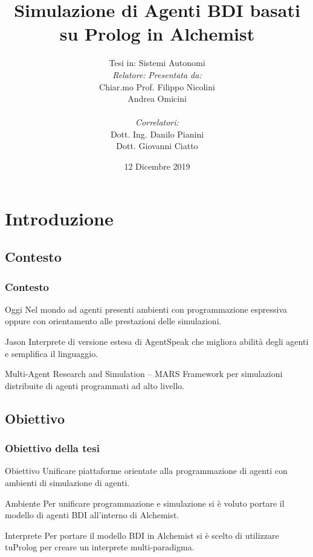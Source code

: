 \documentclass[handout]{beamer}\mode<presentation>{\usetheme{AMSCesenaBleu}}
\title[Prolog BDI agents on Alchemist]{Simulazione di Agenti BDI basati su Prolog in Alchemist}
\author[Filippo Nicolini]{Tesi in: Sistemi Autonomi\\
[0.5cm]
\textit{Relatore:} \hspace{6.55cm} \textit{Presentata da:}\\
Chiar.mo Prof. \hspace{5.5cm} Filippo Nicolini\\
Andrea Omicini \hspace{7.6cm} \phantom{g}\\
\textit{\\Correlatori:} \hspace{8.25cm} \phantom{g}\\
Dott. Ing. Danilo Pianini \hspace{6cm} \phantom{g}\\
Dott. Giovanni Ciatto \hspace{6.5cm} \phantom{g}\\
}
\institute[]{
\textsc{Alma Mater Studiorum} -- Università di Bologna \\
Campus di Cesena}
\date{12 Dicembre 2019}
\begin{document}
\maketitle


\section{Introduzione}

\subsection{Contesto}
\begin{frame}
\frametitle{Contesto}
\begin{block}{Oggi}
Nel mondo ad agenti presenti ambienti con programmazione espressiva oppure con orientamento alle prestazioni delle simulazioni.
\end{block}

\begin{block}{Jason}
Interprete di versione estesa di AgentSpeak che migliora abilità degli agenti e semplifica il linguaggio.
\end{block}

\begin{block}{Multi-Agent Research and Simulation -- MARS}
Framework per simulazioni distribuite di agenti programmati ad alto livello.
\end{block}
\end{frame}

\subsection{Obiettivo}
\begin{frame}
\frametitle{Obiettivo della tesi}
\begin{block}{Obiettivo}
\alert{Unificare} piattaforme orientate alla \alert{programmazione di agenti} con ambienti di \alert{simulazione di agenti}.
\end{block}

\begin{block}{Ambiente}
Per unificare programmazione e simulazione si è voluto portare il modello di agenti BDI all'interno di Alchemist.
\end{block}

\begin{block}{Interprete}
Per portare il modello BDI in Alchemist si è scelto di utilizzare tuProlog per creare un interprete multi-paradigma.
\end{block}
\end{frame}
\end{document}
